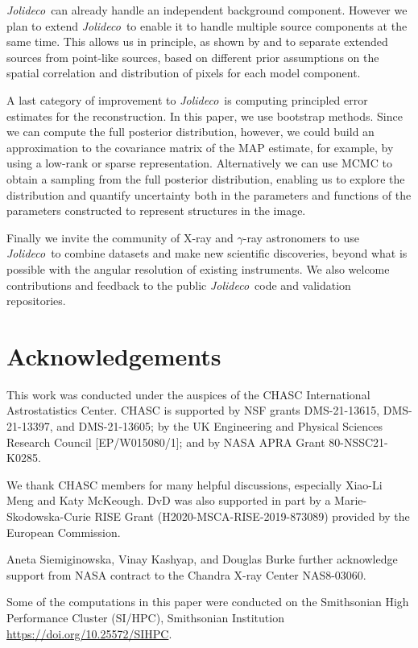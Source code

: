 \documentclass[twocolumn, lineno]{aastex631}
\newcommand{\jolideco}{\textit{Jolideco}~}
\newcommand{\gammaray}{$\gamma$-ray\xspace}
\begin{document}
    \jolideco can already handle an independent background component. However we plan to extend \jolideco to enable it to handle multiple source components at the same time. This allows us in principle, as shown by \cite{Selig2015} and \citet{Pumpe2018} to separate extended sources from point-like sources, based on different prior assumptions on the spatial correlation and distribution of pixels for each model component. 

    A last category of improvement to \jolideco is computing principled error estimates for the reconstruction. In this paper, we use bootstrap methods. Since we can compute the full posterior distribution, however, we could build an approximation to the covariance matrix of the MAP estimate, for example, by using a low-rank or sparse representation.
    Alternatively we can use MCMC to obtain a sampling from the full posterior distribution, enabling us to explore the distribution and quantify  uncertainty both in the parameters and functions of the parameters constructed to represent structures in the image. 
    
    Finally we invite the community of X-ray and \gammaray astronomers to use  \jolideco to combine datasets and make new scientific discoveries, beyond what is possible with the angular resolution of existing instruments. We also welcome contributions and feedback to the public \jolideco code and validation repositories. 

    \section*{Acknowledgements}
    This work was conducted under the auspices of the CHASC International Astrostatistics Center.
    CHASC is supported by NSF grants DMS-21-13615, DMS-21-13397, and DMS-21-13605; by the UK Engineering
    and Physical Sciences Research Council [EP/W015080/1]; and by NASA APRA Grant 80-NSSC21-K0285.
    
    We thank CHASC members for many helpful discussions, especially Xiao-Li Meng and Katy McKeough.
    DvD was also supported in part by a Marie-Skodowska-Curie RISE Grant (H2020-MSCA-RISE-2019-873089)
    provided by the European Commission.
    
    Aneta Siemiginowska, Vinay Kashyap, and Douglas Burke further acknowledge support from NASA
    contract to the Chandra X-ray Center NAS8-03060.

    Some of the computations in this paper were conducted on the Smithsonian High Performance
    Cluster (SI/HPC), Smithsonian Institution \url{https://doi.org/10.25572/SIHPC}.
\end{document}
